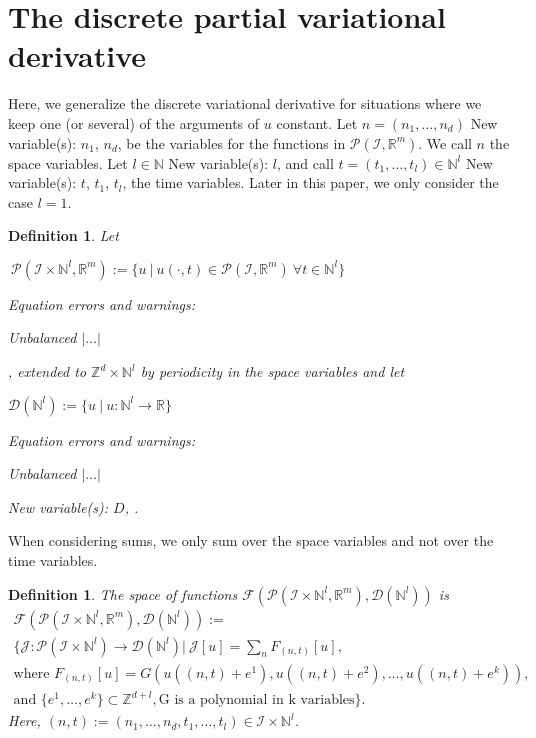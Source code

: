 \documentclass[sigconf,twocolumn]{acmart}
\newcommand{\1}{{\chi}}
\numberwithin{equation}{section}
\theoremstyle{thmlemcorr}
\numberwithin{theorem}{section}
\theoremstyle{thmlemcorr*}
\theoremstyle{defi}
\newtheorem{definition}[theorem]{Definition}
\theoremstyle{remexample}
\theoremstyle{ass}
\begin{document}
\section{The discrete partial variational derivative}
\label{pvard}
Here, we generalize the discrete variational derivative for situations where we keep one (or several) of the arguments of \(u\) constant.
Let \(n=(n_1,\ldots,n_d)\)
{\color{blue} New variable(s): \(n_1\), \(n_d\),  }
 be the variables for the functions in \(\mathcal{P}({\mathcal{I}},{\mathbb{R}}^m)\). We call \(n\) the space variables. Let \(l\in{\mathbb{N}}\)
{\color{blue} New variable(s): \(l\),  }
 and call \(t=(t_1,\ldots,t_l)\in{\mathbb{N}}^l\)
{\color{blue} New variable(s): \(t\), \(t_1\), \(t_l\),  }
 the time variables. Later in this paper, we only consider the case \(l=1\).
\begin{definition}
	Let {\color{red} \(\ \mathcal{P}({\mathcal{I}}\times{\mathbb{N}}^l,{\mathbb{R}}^m):=\{u\ |\ u(\cdot,t)\in\mathcal{P}({\mathcal{I}},{\mathbb{R}}^m)\ \forall t\in{\mathbb{N}}^l \}\)

  Equation errors and warnings:

 Unbalanced $|\hdots|$}

, extended to \({\mathbb{Z}}^d\times{\mathbb{N}}^l\) by periodicity in the space variables and let {\color{red} \(\mathcal{D}({\mathbb{N}}^l):=\{u\ |\ u:{\mathbb{N}}^l\rightarrow{\mathbb{R}}\}\)

  Equation errors and warnings:

 Unbalanced $|\hdots|$}


{\color{blue} New variable(s): \(D\),  }
.
\end{definition}
When considering sums, we only sum over the space variables and not over the time variables.
\begin{definition}
	\label{quantityfunc2}
	The space of functions \(\mathcal{F}(\mathcal{P}({\mathcal{I}}\times{\mathbb{N}}^l,{\mathbb{R}}^m),\mathcal{D}({\mathbb{N}}^l))\) is
	\begin{gather*}
		\mathcal{F}(\mathcal{P}({\mathcal{I}}\times{\mathbb{N}}^l,{\mathbb{R}}^m),\mathcal{D}({\mathbb{N}}^l)):=\\	
		\Bigg\{\mathcal{J}:\mathcal{P}({\mathcal{I}}\times{\mathbb{N}}^l)\rightarrow\mathcal{D}({\mathbb{N}}^l) \Bigg|\ \mathcal{J}[u]=\sum_{n}F_{(n,t)}[u],\\
		\text{where } F_{(n,t)}[u]=G(u((n,t)+e^1),u((n,t)+e^2),\ldots,u((n,t)+e^k)),\\
		\text{and }
		\{e^1,\ldots,e^k\}\subset{\mathbb{Z}}^{d+l},\text{G is a polynomial in k variables}\Bigg\}.
	\end{gather*}
Here, \((n,t):=(n_1,\ldots,n_d,t_1,\ldots,t_l)\in{\mathcal{I}}\times{\mathbb{N}}^l\).
\end{definition}
\end{document}
